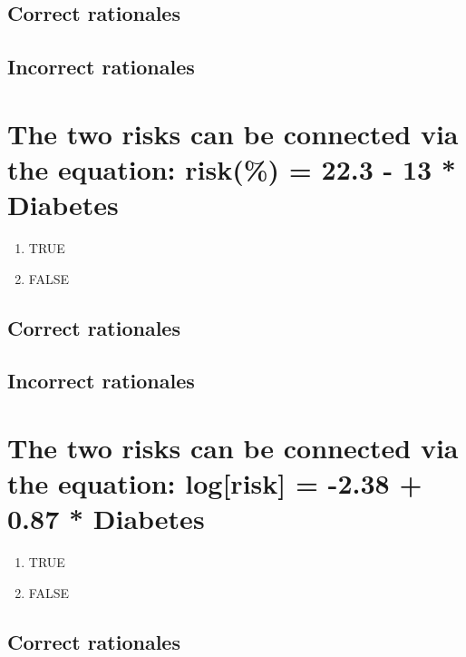 \documentclass[letterpaper,9pt,twoside,printwatermark=false]{pinp}
\providecommand{\tightlist}{%
  \setlength{\itemsep}{0pt}\setlength{\parskip}{0pt}}
\begin{document}
\subsection{Correct rationales}\label{correct-rationales-2}

\subsection{Incorrect rationales}\label{incorrect-rationales-2}

\section{The two risks can be connected via the equation: risk(\%) =
22.3 - 13 *
Diabetes}\label{the-two-risks-can-be-connected-via-the-equation-risk-22.3---13-diabetes}

\begin{enumerate}
\def\labelenumi{\alph{enumi}.}
\tightlist
\item
  TRUE
\item
  FALSE
\end{enumerate}

\subsection{Correct rationales}\label{correct-rationales-3}

\subsection{Incorrect rationales}\label{incorrect-rationales-3}

\section{The two risks can be connected via the equation: log{[}risk{]}
= -2.38 + 0.87 *
Diabetes}\label{the-two-risks-can-be-connected-via-the-equation-logrisk--2.38-0.87-diabetes}

\begin{enumerate}
\def\labelenumi{\alph{enumi}.}
\tightlist
\item
  TRUE
\item
  FALSE
\end{enumerate}

\subsection{Correct rationales}\label{correct-rationales-4}
\end{document}

